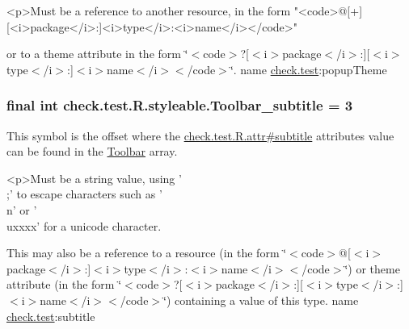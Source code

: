 \begin{DoxyVerb}      <p>Must be a reference to another resource, in the form "<code>@[+][<i>package</i>:]<i>type</i>:<i>name</i></code>"
\end{DoxyVerb}
 or to a theme attribute in the form \char`\"{}$<$code$>$?\mbox{[}$<$i$>$package$<$/i$>$\+:\mbox{]}\mbox{[}$<$i$>$type$<$/i$>$\+:\mbox{]}$<$i$>$name$<$/i$>$$<$/code$>$\char`\"{}.  name \hyperlink{namespacecheck_1_1test}{check.\+test}\+:popup\+Theme \hypertarget{classcheck_1_1test_1_1_r_1_1styleable_a8215e68d4a9819e686f4e4bbe6f2faef}{}
\subsubsection[{Toolbar\+\_\+subtitle}]{\setlength{\rightskip}{0pt plus 5cm}final int check.\+test.\+R.\+styleable.\+Toolbar\+\_\+subtitle = 3\hspace{0.3cm}{\ttfamily [static]}}\label{classcheck_1_1test_1_1_r_1_1styleable_a8215e68d4a9819e686f4e4bbe6f2faef}
This symbol is the offset where the \hyperlink{classcheck_1_1test_1_1_r_1_1attr_aba79cc7bd7219629cd636e1c463aa4af}{check.\+test.\+R.\+attr\#subtitle} attribute\textquotesingle{}s value can be found in the \hyperlink{classcheck_1_1test_1_1_r_1_1styleable_a1a7fa90223693abef77e7484cca2df54}{Toolbar} array.

\begin{DoxyVerb}      <p>Must be a string value, using '\\;' to escape characters such as '\\n' or '\\uxxxx' for a unicode character.
\end{DoxyVerb}
 

This may also be a reference to a resource (in the form \char`\"{}$<$code$>$@\mbox{[}$<$i$>$package$<$/i$>$\+:\mbox{]}$<$i$>$type$<$/i$>$\+:$<$i$>$name$<$/i$>$$<$/code$>$\char`\"{}) or theme attribute (in the form \char`\"{}$<$code$>$?\mbox{[}$<$i$>$package$<$/i$>$\+:\mbox{]}\mbox{[}$<$i$>$type$<$/i$>$\+:\mbox{]}$<$i$>$name$<$/i$>$$<$/code$>$\char`\"{}) containing a value of this type.  name \hyperlink{namespacecheck_1_1test}{check.\+test}\+:subtitle \hypertarget{classcheck_1_1test_1_1_r_1_1styleable_a144e9a2b2baf47ad3bc709462b1a5bbb}{}
